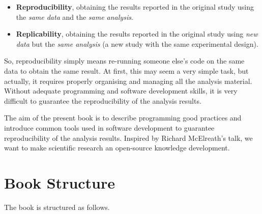 \documentclass[
  11pt,
]{book}
\providecommand{\tightlist}{%
  \setlength{\itemsep}{0pt}\setlength{\parskip}{0pt}}
\begin{document}
\begin{itemize}
\tightlist
\item
  \textbf{Reproducibility}, obtaining the results reported in the original study using the \emph{same data} and the \emph{same analysis}.
\item
  \textbf{Replicability}, obtaining the results reported in the original study using \emph{new data} but the \emph{same analysis} (a new study with the same experimental design).
\end{itemize}

So, reproducibility simply means re-running someone else's code on the same data to obtain the same result. At first, this may seem a very simple task, but actually, it requires properly organising and managing all the analysis material. Without adequate programming and software development skills, it is very difficult to guarantee the reproducibility of the analysis results.

The aim of the present book is to describe programming good practices and introduce common tools used in software development to guarantee reproducibility of the analysis results. Inspired by Richard McElreath's talk, we want to make scientific research an open-source knowledge development.

\hypertarget{book-structure}{%
\section{Book Structure}\label{book-structure}}

The book is structured as follows.
\end{document}
